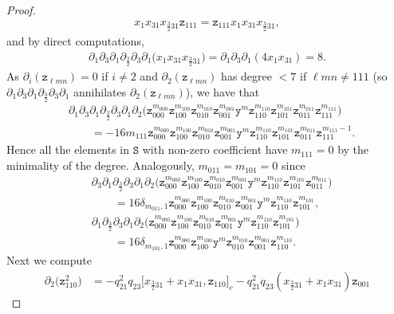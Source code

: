 \documentclass[pdftex]{sigma}
\numberwithin{equation}{section}
\newcommand{\yt}{\mathtt{y}}
\newcommand{\zt}{\mathtt{z}}
\newcommand{\tresdos}{\frac{3}{2}}
\begin{document}
\begin{proof}
\begin{align*}
x_1x_{31}x_{\tresdos31}\zt_{111}=\zt_{111}x_1x_{31}x_{\tresdos31},
\end{align*}
and by direct computations,
\begin{align*}
\partial_1\partial_3\partial_1\partial_{\tresdos}\partial_3\partial_1\big(x_1x_{31}x_{\tresdos31}\big)=
\partial_1\partial_3\partial_1(4x_1x_{31})=8.
\end{align*}
As $\partial_i(\zt_{\ell mn})=0$ if $i\ne 2$ and $\partial_2(\zt_{\ell mn})$ has degree $<7$ if $\ell mn\ne 111$ (so $\partial_1\partial_3\partial_1\partial_{\tresdos}\partial_3\partial_1$ annihilates $\partial_2(\zt_{\ell mn})$), we have that
\begin{align*}
&\partial_1\partial_3 \partial_1\partial_{\tresdos}\partial_3\partial_1\partial_2\big(\zt_{000}^{m_{000}} \zt_{100}^{m_{100}} \zt_{010}^{m_{010}} \zt_{001}^{m_{001}} \yt^m \zt_{110}^{m_{110}} \zt_{101}^{m_{101}} \zt_{011}^{m_{011}} \zt_{111}^{m_{111}}\big)
\\ &\qquad{} = -16m_{111} \zt_{000}^{m_{000}} \zt_{100}^{m_{100}} \zt_{010}^{m_{010}} \zt_{001}^{m_{001}} \yt^m \zt_{110}^{m_{110}} \zt_{101}^{m_{101}} \zt_{011}^{m_{011}} \zt_{111}^{m_{111}-1}.
\end{align*}
Hence all the elements in $\mathtt{S}$ with non-zero coefficient have $m_{111}=0$ by the minimality of the degree. Analogously, $m_{011}=m_{101}=0$ since
\begin{align*}
& \partial_3 \partial_1\partial_{\tresdos}\partial_3\partial_1\partial_2\big(\zt_{000}^{m_{000}} \zt_{100}^{m_{100}} \zt_{010}^{m_{010}} \zt_{001}^{m_{001}} \yt^m \zt_{110}^{m_{110}} \zt_{101}^{m_{101}} \zt_{011}^{m_{011}}\big)
\\
& \qquad {}=16\delta_{m_{011},1} \zt_{000}^{m_{000}} \zt_{100}^{m_{100}} \zt_{010}^{m_{010}} \zt_{001}^{m_{001}} \yt^m \zt_{110}^{m_{110}} \zt_{101}^{m_{101}},
\\
& \partial_1\partial_{\tresdos}\partial_3\partial_1\partial_2\big(\zt_{000}^{m_{000}} \zt_{100}^{m_{100}} \zt_{010}^{m_{010}} \zt_{001}^{m_{001}} \yt^m \zt_{110}^{m_{110}} \zt_{101}^{m_{101}}\big)
\\
& \qquad {}=16\delta_{m_{101},1} \zt_{000}^{m_{000}} \zt_{100}^{m_{100}} \yt^m \zt_{010}^{m_{010}} \zt_{001}^{m_{001}} \zt_{110}^{m_{110}}.
\end{align*}
Next we compute
\begin{align*}
\partial_2 \big(\zt_{110}^2\big) &= -q_{21}^2q_{23} \big[x_{\tresdos31}+x_1x_{31}, \zt_{110}\big]_c
-q_{21}^2q_{23} (x_{\tresdos31}+x_1x_{31})\zt_{001}

\end{align*}
\end{proof}
\end{document}
